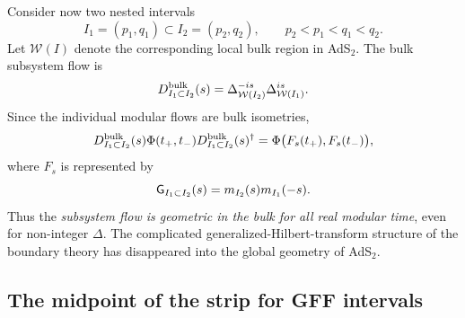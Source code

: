 \documentclass[a4paper,11pt]{article}
\theoremstyle{definition}
\begin{document}
Consider now two nested intervals
\begin{equation}
    I_1=(p_1,q_1)
    \subset
    I_2=(p_2,q_2),
    \qquad
    p_2<p_1<q_1<q_2.
\end{equation}
Let $\mathcal W(I)$ denote the corresponding local bulk region in
AdS$_2$. The bulk subsystem flow is
\begin{equation}
    D^{\rm bulk}_{I_1\subset I_2}(s)
    =
    \Delta_{\mathcal W(I_2)}^{-is}
    \Delta_{\mathcal W(I_1)}^{is}.
    \label{eq:GFF-bulk-subsystem-def}
\end{equation}
Since the individual modular flows are bulk isometries,
\begin{equation}
    D^{\rm bulk}_{I_1\subset I_2}(s)
    \Phi(t_+,t_-)
    D^{\rm bulk}_{I_1\subset I_2}(s)^\dagger
    =
    \Phi\bigl(
        F_s(t_+),F_s(t_-)
    \bigr),
    \label{eq:GFF-bulk-subsystem-action}
\end{equation}
where $F_s$ is represented by
\begin{equation}
    {\sf G}_{I_1\subset I_2}(s)
    =
    m_{I_2}(s)m_{I_1}(-s).
    \label{eq:GFF-subsystem-matrix}
\end{equation}
Thus the \emph{subsystem flow is geometric in the bulk for all real
modular time}, even for non-integer $\Delta$. The complicated
generalized-Hilbert-transform structure of the boundary theory has
disappeared into the global geometry of AdS$_2$.

\subsection{The midpoint of the strip for GFF intervals}
\end{document}
